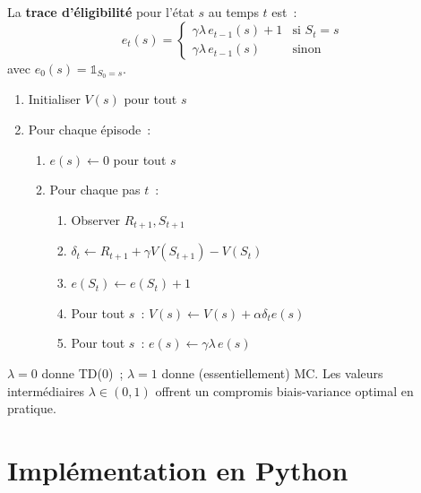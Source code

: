 \begin{definition}
La \textbf{trace d'\'eligibilit\'e} pour l'\'etat $s$ au temps $t$ est~:
\[
    e_t(s) = \begin{cases}
        \gamma \lambda \, e_{t-1}(s) + 1 & \text{si } S_t = s \\
        \gamma \lambda \, e_{t-1}(s) & \text{sinon}
    \end{cases}
\]
avec $e_0(s) = \mathbb{1}_{S_0 = s}$.
\end{definition}

\begin{algorithme}[title=\textbf{TD($\lambda$) avec traces d'\'eligibilit\'e}]
\begin{enumerate}
    \item Initialiser $V(s)$ pour tout $s$
    \item Pour chaque \'episode~:
    \begin{enumerate}
        \item $e(s) \leftarrow 0$ pour tout $s$
        \item Pour chaque pas $t$~:
        \begin{enumerate}
            \item Observer $R_{t+1}, S_{t+1}$
            \item $\delta_t \leftarrow R_{t+1} + \gamma V(S_{t+1}) - V(S_t)$
            \item $e(S_t) \leftarrow e(S_t) + 1$
            \item Pour tout $s$~: $V(s) \leftarrow V(s) + \alpha \delta_t e(s)$
            \item Pour tout $s$~: $e(s) \leftarrow \gamma \lambda \, e(s)$
        \end{enumerate}
    \end{enumerate}
\end{enumerate}
\end{algorithme}

\begin{remarque}
$\lambda = 0$ donne TD(0)~; $\lambda = 1$ donne (essentiellement) MC. Les valeurs
interm\'ediaires $\lambda \in (0,1)$ offrent un compromis biais-variance optimal
en pratique.
\end{remarque}

\section{Impl\'ementation en Python}

